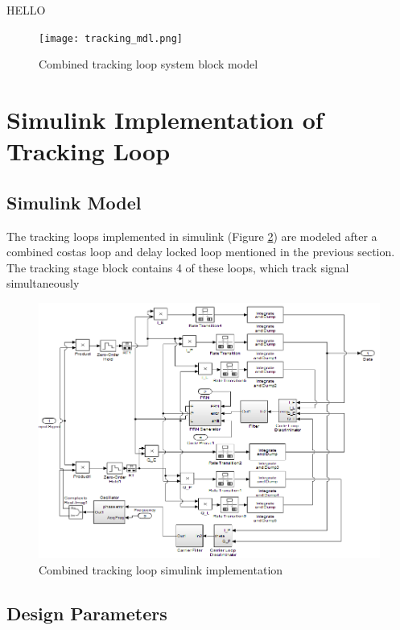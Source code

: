 \documentclass[11pt]{article}
\numberwithin{equation}{subsection}
\begin{document}
	
	HELLO\\
	\begin{figure}
		\centering
		\texttt{[image: tracking\_mdl.png]}
		\caption{Combined tracking loop system block model}
		\label{Combined tracking loop system block model}
	\end{figure}
	
	
	
	
	
	\section{Simulink Implementation of Tracking Loop}
	
	\subsection{Simulink Model}
	
	The tracking loops implemented in simulink (Figure \ref{tracking_loop}) are modeled after a combined costas loop and delay locked loop mentioned in the previous section. The tracking stage block contains 4 of these loops, which track signal simultaneously 
	\begin{figure}
		\centering
		\includegraphics[width=\textwidth]{Tracking_Loop}
		\caption{Combined tracking loop simulink implementation}
		\label{tracking_loop}
	\end{figure}
	
	\subsection{Design Parameters}
	
\end{document}
